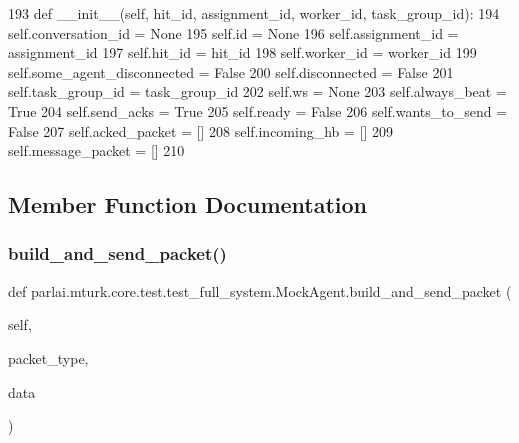 \begin{DoxyCode}
193     \textcolor{keyword}{def }\_\_init\_\_(self, hit\_id, assignment\_id, worker\_id, task\_group\_id):
194         self.conversation\_id = \textcolor{keywordtype}{None}
195         self.id = \textcolor{keywordtype}{None}
196         self.assignment\_id = assignment\_id
197         self.hit\_id = hit\_id
198         self.worker\_id = worker\_id
199         self.some\_agent\_disconnected = \textcolor{keyword}{False}
200         self.disconnected = \textcolor{keyword}{False}
201         self.task\_group\_id = task\_group\_id
202         self.ws = \textcolor{keywordtype}{None}
203         self.always\_beat = \textcolor{keyword}{True}
204         self.send\_acks = \textcolor{keyword}{True}
205         self.ready = \textcolor{keyword}{False}
206         self.wants\_to\_send = \textcolor{keyword}{False}
207         self.acked\_packet = []
208         self.incoming\_hb = []
209         self.message\_packet = []
210 
\end{DoxyCode}


\subsection{Member Function Documentation}
\mbox{\label{classparlai_1_1mturk_1_1core_1_1test_1_1test__full__system_1_1MockAgent_aea4e710be39de9f90e3dd9b9b6882874}} 
\subsubsection{\texorpdfstring{build\+\_\+and\+\_\+send\+\_\+packet()}{build\_and\_send\_packet()}}
{\footnotesize\ttfamily def parlai.\+mturk.\+core.\+test.\+test\+\_\+full\+\_\+system.\+Mock\+Agent.\+build\+\_\+and\+\_\+send\+\_\+packet (\begin{DoxyParamCaption}\item[{}]{self,  }\item[{}]{packet\+\_\+type,  }\item[{}]{data }\end{DoxyParamCaption})}



